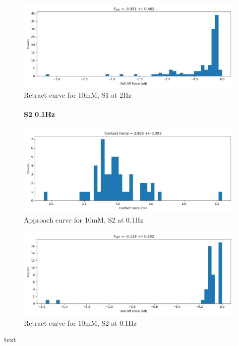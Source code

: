 \begin{figure}[h!]
\centering
\includegraphics[width=\textwidth]{chapter7/Tip speed/10mM/S1 2Hz/retract_f_a_hist.jpg}
\caption{Retract curve for 10mM, S1 at 2Hz}
\end{figure}
\newpage


\begin{figure}[h!]
\paragraph{S2 0.1Hz}
\centering
\includegraphics[width=\textwidth]{chapter7/Tip speed/10mM/S2 0.1Hz/approach_f_c_hist.jpg}
\caption{Approach curve for 10mM, S2 at 0.1Hz}
\end{figure}

\begin{figure}[h!]
\centering
\includegraphics[width=\textwidth]{chapter7/Tip speed/10mM/S2 0.1Hz/retract_f_a_hist.jpg}
\caption{Retract curve for 10mM, S2 at 0.1Hz}
\end{figure}
text
\newpage


